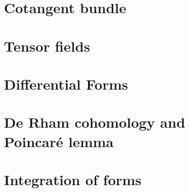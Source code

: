 \documentclass[nobib, a4paper]{tufte-book}
\theoremstyle{plain}
\theoremstyle{definition}
\theoremstyle{remark}
\newcommand{\Q}{\mathbb{Q}}
\newcommand{\R}{\mathbb{R}}
\begin{document}
\chapter{Cotangent bundle}\label{cg:ctb}


\chapter{Tensor fields}\label{cg:tf}


\chapter{Differential Forms}


\chapter{De Rham cohomology and Poincar\'e lemma}


\chapter{Integration of forms}


\begin{appendices}
  
\end{appendices}




\printbibliography
{}
\end{document}
